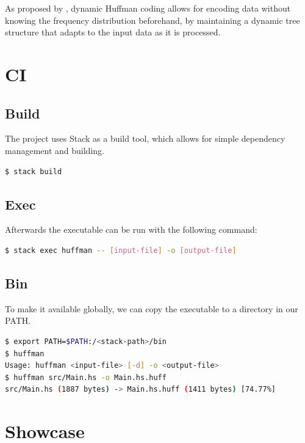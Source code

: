 \documentclass{article}
\begin{document}
As proposed by \cite{knuth1985dynamic}, dynamic Huffman coding allows for encoding data without knowing the frequency distribution beforehand,
by maintaining a dynamic tree structure that adapts to the input data as it is processed.

\section{CI}

\subsection{Build}

The project uses Stack as a build tool, which allows for simple dependency management and building.

\begin{lstlisting}[language=bash]
$ stack build
\end{lstlisting}

\subsection{Exec}

Afterwards the executable can be run with the following command:

\begin{lstlisting}[language=bash]
$ stack exec huffman -- [input-file] -o [output-file]
\end{lstlisting}

\subsection{Bin}

To make it available globally, we can copy the executable to a directory in our PATH.

\begin{lstlisting}[language=bash]
$ export PATH=$PATH:/<stack-path>/bin
$ huffman
Usage: huffman <input-file> [-d] -o <output-file>
$ huffman src/Main.hs -o Main.hs.huff
src/Main.hs (1887 bytes) -> Main.hs.huff (1411 bytes) [74.77%]
\end{lstlisting}

\section{Showcase}
\end{document}
